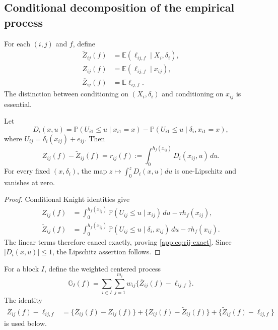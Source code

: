 \documentclass[twoside,11pt]{article}
\newenvironment{revision}{\color{revisionred}}{}
\begin{document}
\begin{revision}
\subsection{Conditional decomposition of the empirical process}

For each $(i,j)$ and $f$, define
\begin{align}
 \widetilde Z_{ij}(f)
 &=\mathbb E(\ell_{ij,f}\mid X_i,\delta_i),                     \label{app:eq:tildeZ}\\
 Z_{ij}(f)
 &=\mathbb E(\ell_{ij,f}\mid x_{ij}),                           \label{app:eq:Z}\\
 \overline Z_{ij}(f)&=\mathbb E\ell_{ij,f}.                    \label{app:eq:barZ}
\end{align}
The distinction between conditioning on $(X_i,\delta_i)$ and conditioning on
$x_{ij}$ is essential.

\begin{lemma}
\label{app:lem:exact-spatial}
Let
\begin{equation}
 D_i(x,u)=\mathbb P(U_{i1}\le u\mid x_{i1}=x)
 -\mathbb P(U_{i1}\le u\mid\delta_i,x_{i1}=x),                 \label{app:eq:Di}
\end{equation}
where $U_{ij}=\delta_i(x_{ij})+e_{ij}$.  Then
\begin{equation}
 Z_{ij}(f)-\widetilde Z_{ij}(f)
 =r_{ij}(f):=\int_0^{h_f(x_{ij})}D_i(x_{ij},u)\,du.             \label{app:eq:rij-exact}
\end{equation}
For every fixed $(x,\delta_i)$, the map $z\mapsto\int_0^zD_i(x,u)du$ is
one-Lipschitz and vanishes at zero.
\end{lemma}

\begin{proof}
Conditional Knight identities give
\begin{align*}
 Z_{ij}(f)
 &=\int_0^{h_f(x_{ij})}
   \mathbb P(U_{ij}\le u\mid x_{ij})\,du-\tau h_f(x_{ij}),\\
 \widetilde Z_{ij}(f)
 &=\int_0^{h_f(x_{ij})}
   \mathbb P(U_{ij}\le u\mid\delta_i,x_{ij})\,du-\tau h_f(x_{ij}).
\end{align*}
The linear terms therefore cancel exactly, proving
\eqref{app:eq:rij-exact}.  Since $|D_i(x,u)|\le1$, the Lipschitz assertion
follows.
\end{proof}

For a block $I$, define the weighted centered process
\begin{equation}
 \mathbb G_I(f)=
 \sum_{i\in I}\sum_{j=1}^{m_i}w_{ij}
 \{\overline Z_{ij}(f)-\ell_{ij,f}\}.                           \label{app:eq:block-process}
\end{equation}
The identity
\begin{align}
 \overline Z_{ij}(f)-\ell_{ij,f}
 &=\{\overline Z_{ij}(f)-Z_{ij}(f)\}
   +\{Z_{ij}(f)-\widetilde Z_{ij}(f)\}
   +\{\widetilde Z_{ij}(f)-\ell_{ij,f}\}                       \label{app:eq:three-way-decomposition}
\end{align}
is used below.


\end{revision}
\end{document}
